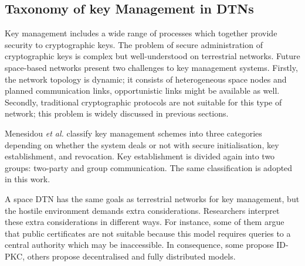 

  


\subsection{Taxonomy of key Management in DTNs}
\label{sec:taxonomy}

Key management includes a wide range of processes which together provide security to cryptographic keys.  The problem of secure administration of cryptographic keys is complex but well-understood on terrestrial networks. Future space-based networks present two challenges to key management systems. Firstly, the network topology is dynamic; it consists of heterogeneous space nodes and planned communication links, opportunistic links might be available as well. Secondly, traditional cryptographic protocols are not suitable for this type of network; this problem is widely discussed in previous sections.


Menesidou \textit{et al.} \cite{menesidou2017cryptographic} classify key management schemes into three categories depending on whether the system deals or not with secure initialisation, key establishment, and revocation. Key establishment is divided again into two groups: two-party and group communication. The same classification is adopted in this work. 


A space DTN has the same goals as terrestrial networks for key management, but the hostile environment demands extra considerations. Researchers interpret these extra considerations in different ways. For instance, some of them argue that public certificates are not suitable because this model requires queries to a central authority which may be inaccessible. In consequence, some propose ID-PKC, others propose decentralised and fully distributed models.  

